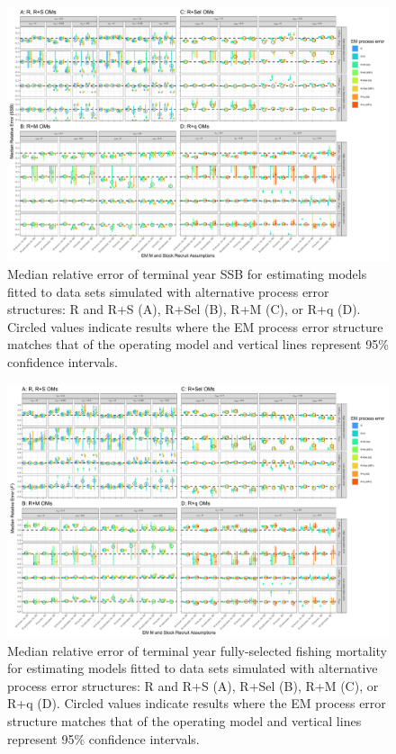 \documentclass[
  12pt,
]{article}
\begin{document}
\begin{landscape}
\begin{figure}
\begin{center}
\includegraphics{term_SSB_bias_plots}
\end{center}
\caption{Median relative error of terminal year SSB for estimating models fitted to data sets simulated with alternative process error structures: R and R+S (A), R+Sel (B), R+M (C), or R+q (D). Circled values indicate results where the EM process error structure matches that of the operating model and vertical lines represent 95\% confidence intervals.}\label{SSB_rel_error}
\end{figure}
\end{landscape}

\begin{landscape}
\begin{figure}
\begin{center}
\includegraphics{term_F_bias_plots}
\end{center}
\caption{Median relative error of terminal year fully-selected fishing mortality for estimating models fitted to data sets simulated with alternative process error structures: R and R+S (A), R+Sel (B), R+M (C), or R+q (D). Circled values indicate results where the EM process error structure matches that of the operating model and vertical lines represent 95\% confidence intervals.}\label{F_rel_error}
\end{figure}
\end{landscape}
\end{document}
